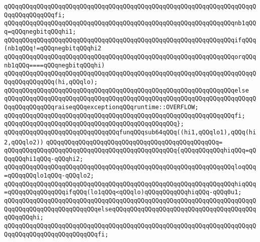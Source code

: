 \verb|qQQqqQQqqQQqqQQqqQQqqQQqqQQqqQQqqQQqqQQqqQQqqQQqqQQqqQQqqQQqqQQqqQQqqQQqqQQqqQQqqQQqfi;|\newline
\newline
\verb|qQQqqQQqqQQqqQQqqQQqqQQqqQQqqQQqqQQqqQQqqQQqqQQqqQQqqQQqqQQqqQQqnb1qQQq=qQQqnegbitqQQqhi1;|\newline
\newline
\verb|qQQqqQQqqQQqqQQqqQQqqQQqqQQqqQQqqQQqqQQqqQQqqQQqqQQqqQQqqQQqqQQqifqQQq(nb1qQQq!=qQQqnegbitqQQqhi2|\newline
\verb|qQQqqQQqqQQqqQQqqQQqqQQqqQQqqQQqqQQqqQQqqQQqqQQqqQQqqQQqqQQqqQQqorqQQqnb1qQQq====qQQqnegbitqQQqhi)|\newline
\verb|qQQqqQQqqQQqqQQqqQQqqQQqqQQqqQQqqQQqqQQqqQQqqQQqqQQqqQQqqQQqqQQqqQQqqQQqqQQqqQQqqQQq(hi,qQQqlo);|\newline
\verb|qQQqqQQqqQQqqQQqqQQqqQQqqQQqqQQqqQQqqQQqqQQqqQQqqQQqqQQqqQQqqQQqelse|\newline
\verb|qQQqqQQqqQQqqQQqqQQqqQQqqQQqqQQqqQQqqQQqqQQqqQQqqQQqqQQqqQQqqQQqqQQqqQQqqQQqqQQqqQQqraiseqQQqexceptionqQQqruntime::OVERFLOW;|\newline
\verb|qQQqqQQqqQQqqQQqqQQqqQQqqQQqqQQqqQQqqQQqqQQqqQQqqQQqqQQqqQQqqQQqfi;|\newline
\verb|qQQqqQQqqQQqqQQqqQQqqQQqqQQqqQQqqQQqqQQqqQQqqQQq};|\newline
\newline
\verb|qQQqqQQqqQQqqQQqqQQqqQQqqQQqqQQqfunqQQqsub64qQQq((hi1,qQQqlo1),qQQq(hi2,qQQqlo2))|\newline
\verb|qQQqqQQqqQQqqQQqqQQqqQQqqQQqqQQqqQQqqQQqqQQqqQQq=|\newline
\verb|qQQqqQQqqQQqqQQqqQQqqQQqqQQqqQQqqQQqqQQqqQQqqQQq{qQQqqQQqqQQqhiqQQq=qQQqqQQqhi1qQQq-qQQqhi2;|\newline
\verb|qQQqqQQqqQQqqQQqqQQqqQQqqQQqqQQqqQQqqQQqqQQqqQQqqQQqqQQqqQQqqQQqloqQQq=qQQqqQQqlo1qQQq-qQQqlo2;|\newline
\newline
\verb|qQQqqQQqqQQqqQQqqQQqqQQqqQQqqQQqqQQqqQQqqQQqqQQqqQQqqQQqqQQqqQQqhiqQQq=qQQqqQQqqQQqqQQqifqQQq(lo1qQQq<qQQqlo)qQQqqQQqqQQqhiqQQq-qQQq0u1;|\newline
\verb|qQQqqQQqqQQqqQQqqQQqqQQqqQQqqQQqqQQqqQQqqQQqqQQqqQQqqQQqqQQqqQQqqQQqqQQqqQQqqQQqqQQqqQQqqQQqqQQqelseqQQqqQQqqQQqqQQqqQQqqQQqqQQqqQQqqQQqqQQqqQQqqQQqhi;|\newline
\verb|qQQqqQQqqQQqqQQqqQQqqQQqqQQqqQQqqQQqqQQqqQQqqQQqqQQqqQQqqQQqqQQqqQQqqQQqqQQqqQQqqQQqqQQqqQQqqQQqfi;|\newline
\newline
